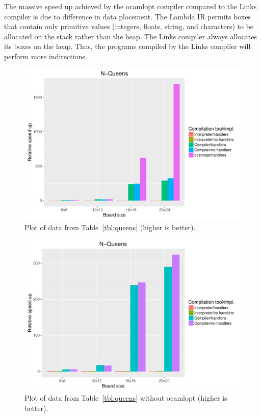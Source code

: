 \documentclass[12pt,mscres,cdtppar,twoside,openright,logo,rightchapter,normalheadings]{infthesis}
\theoremstyle{definition}
\begin{document}
The massive speed up achieved by the ocamlopt compiler compared to the
Links compiler is due to difference in data placement. The Lambda IR
permits boxes that contain only primitive values (integers, floats,
string, and characters) to be allocated on the stack rather than the
heap. The Links compiler always allocates its boxes on the heap. Thus,
the programs compiled by the Links compiler will perform more
indirections.


\begin{figure}
\centering
\includegraphics[scale=0.65]{plots/nqueens_all.pdf}
\caption{Plot of data from Table~\ref{tbl:queens} (higher is better).}\label{fig:nqueens-all}
\end{figure}
\begin{figure}
\centering
\includegraphics[scale=0.65]{plots/nqueens.pdf}
\caption{Plot of data from Table~\ref{tbl:queens} without ocamlopt
  (higher is better).}\label{fig:nqueens}
\end{figure}
\end{document}
